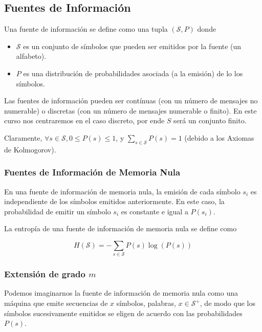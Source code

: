 \subsection{Fuentes de Información}\label{fuentes-de-informaciuxf3n}

Una fuente de información se define como una tupla \((\mathcal{S},P)\)
donde

\begin{itemize}
\tightlist
\item
  \(\mathcal{S}\) es un conjunto de símbolos que pueden ser emitidos por
  la fuente (un alfabeto).
\item
  \(P\) es una distribución de probabilidades asociada (a la emisión) de
  lo los símbolos.
\end{itemize}

Las fuentes de información pueden ser contínuas (con un número de
mensajes no numerable) o discretas (con un número de mensajes numerable
o finito). En este curso nos centraremos en el caso discreto, por ende
\(S\) será un conjunto finito.

Claramente, \(\forall s\in\mathcal{S}, 0\leq P(s)\leq 1\), y
\(\sum_{s \in\mathcal{S}} P(s) = 1\) (debido a los Axiomas de
Kolmogorov).

\subsubsection{Fuentes de Información de Memoria
Nula}\label{fuentes-de-informaciuxf3n-de-memoria-nula}

En una fuente de información de memoria nula, la emisión de cada símbolo
\(s_i\) es independiente de los símbolos emitidos anteriormente. En este
caso, la probabilidad de emitir un símbolo \(s_i\) es constante e igual
a \(P(s_i)\).

La entropía de una fuente de información de memoria nula se define como

\[
H(\mathcal{S}) = -\sum_{s\in\mathcal{S}} P(s)\log\left(P(s)\right)
\]

\subsubsection{\texorpdfstring{Extensión de grado
\(m\)}{Extensión de grado m}}\label{extensiuxf3n-de-grado-m}

Podemos imaginarnos la fuente de información de memoria nula como una
máquina que emite secuencias de \(x\) símbolos, palabras,
\(x\in\mathcal{S}^+\), de modo que los símbolos sucesivamente emitidos
se eligen de acuerdo con las probabilidades \(P(s)\).

